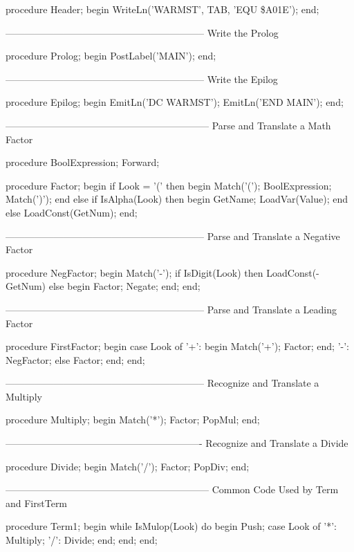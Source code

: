 \documentclass[float=false, crop=false]{standalone}
\begin{document}
\begin{code}
procedure Header;
begin
   WriteLn('WARMST', TAB, 'EQU \$A01E');
end;


{--------------------------------------------------------------}
{ Write the Prolog }

procedure Prolog;
begin
   PostLabel('MAIN');
end;


{--------------------------------------------------------------}
{ Write the Epilog }

procedure Epilog;
begin
   EmitLn('DC WARMST');
   EmitLn('END MAIN');
end;


{---------------------------------------------------------------}
{ Parse and Translate a Math Factor }

procedure BoolExpression; Forward;

procedure Factor;
begin
   if Look = '(' then begin
      Match('(');
      BoolExpression;
      Match(')');
      end
   else if IsAlpha(Look) then begin
      GetName;
      LoadVar(Value);
      end
   else
      LoadConst(GetNum);
end;


{--------------------------------------------------------------}
{ Parse and Translate a Negative Factor }

procedure NegFactor;
begin
   Match('-');
   if IsDigit(Look) then
      LoadConst(-GetNum)
   else begin
      Factor;
      Negate;
   end;
end;


{--------------------------------------------------------------}
{ Parse and Translate a Leading Factor }

procedure FirstFactor;
begin
   case Look of
     '+': begin
             Match('+');
             Factor;
          end;
     '-': NegFactor;
   else  Factor;
   end;
end;


{--------------------------------------------------------------}
{ Recognize and Translate a Multiply }

procedure Multiply;
begin
   Match('*');
   Factor;
   PopMul;
end;


{-------------------------------------------------------------}
{ Recognize and Translate a Divide }

procedure Divide;
begin
   Match('/');
   Factor;
   PopDiv;
end;


{---------------------------------------------------------------}
{ Common Code Used by Term and FirstTerm }

procedure Term1;
begin
   while IsMulop(Look) do begin
      Push;
      case Look of
       '*': Multiply;
       '/': Divide;
      end;
   end;
end;



\end{code}
\end{document}
